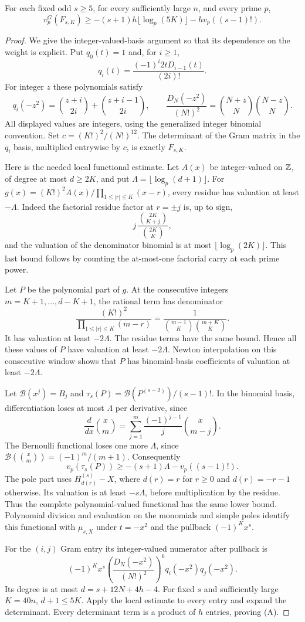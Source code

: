 \begin{proposition}\label{prop:coarse-local-hankel}
For each fixed odd $s\ge5$, for every sufficiently large $n$, and every
prime $p$,
\[
 v_p^G(F_{s,K})\ge
 -(s+1)h\lfloor\log_p(5K)\rfloor-hv_p((s-1)!).             \tag{A}
\]
\end{proposition}
\begin{proof}
We give the integer-valued-basis argument so that its dependence on
the weight is explicit. Put $q_0(t)=1$ and, for $i\ge1$,
\[
 q_i(t)=\frac{(-1)^i2tD_{i-1}(t)}{(2i)!}.
\]
For integer $z$ these polynomials satisfy
\[
 q_i(-z^2)=\binom{z+i}{2i}+\binom{z+i-1}{2i},\qquad
 \frac{D_N(-z^2)}{(N!)^2}=
 \binom{N+z}{N}\binom{N-z}{N}.
\]
All displayed values are integers, using the generalized integer
binomial convention. Set $c=(K!)^2/(N!)^{12}$.
The determinant of the Gram matrix in the $q_i$ basis, multiplied
entrywise by $c$, is exactly $F_{s,K}$.

Here is the needed local functional estimate. Let $A(x)$ be
integer-valued on $\mathbb Z$, of degree at most $d\ge2K$, and put
$\Lambda=\lfloor\log_p(d+1)\rfloor$.
For $g(x)=(K!)^2A(x)/\prod_{1\le |r|\le K}(x-r)$, every residue
has valuation at least $-\Lambda$. Indeed the factorial residue factor
at $r=\pm j$ is, up to sign,
\[
 j\,\frac{\binom{2K}{K+j}}{\binom{2K}{K}},
\]
and the valuation of the denominator binomial is at most
$\lfloor\log_p(2K)\rfloor$. This last bound follows by counting the
at-most-one factorial carry at each prime power.

Let $P$ be the polynomial part of $g$. At the consecutive integers
$m=K+1,\ldots,d-K+1$, the rational term has denominator
\[
 \frac{(K!)^2}{\prod_{1\le|r|\le K}(m-r)}
 =\frac1{\binom{m-1}{K}\binom{m+K}{K}}.
\]
It has valuation at least $-2\Lambda$. The residue terms have the
same bound. Hence all these values of $P$ have valuation at least
$-2\Lambda$. Newton interpolation on this consecutive window shows
that $P$ has binomial-basis coefficients of valuation at least
$-2\Lambda$.

Let $\mathcal B(x^j)=B_j$ and
$\tau_s(P)=\mathcal B(P^{(s-2)})/(s-1)!$.
In the binomial basis, differentiation loses at most $\Lambda$ per
derivative, since
\[
 \frac{d}{dx}\binom{x}{m}
 =\sum_{j=1}^m\frac{(-1)^{j-1}}j\binom{x}{m-j}.
\]
The Bernoulli functional loses one more $\Lambda$, since
$\mathcal B(\binom{x}{m})=(-1)^m/(m+1)$.
Consequently
\[
 v_p(\tau_s(P))\ge-(s+1)\Lambda-v_p((s-1)!).
\]
The pole part uses $H_{d(r)}^{(s)}-X$, where $d(r)=r$ for
$r\ge0$ and $d(r)=-r-1$ otherwise. Its valuation is at least
$-s\Lambda$, before multiplication by the residue. Thus the complete
polynomial-valued functional has the same lower bound.
Polynomial division and evaluation on the monomials and simple poles
identify this functional with $\mu_{s,X}$ under $t=-x^2$ and the
pullback $(-1)^Kx^s$.

For the $(i,j)$ Gram entry its integer-valued numerator after pullback is
\[
 (-1)^Kx^s
 \left(\frac{D_N(-x^2)}{(N!)^2}\right)^6q_i(-x^2)q_j(-x^2).
\]
Its degree is at most $d=s+12N+4h-4$.
For fixed $s$ and sufficiently large $K=40n$, $d+1\le5K$.
Apply the local estimate to every entry and expand the determinant.
Every determinant term is a product of $h$ entries, proving (A).
\end{proof}


